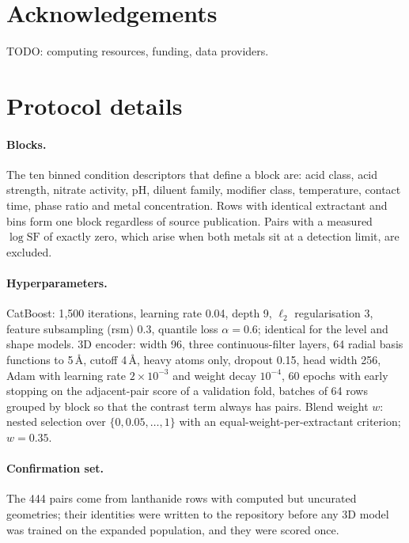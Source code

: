 \documentclass{article}
\begin{document}
\section*{Acknowledgements}
TODO: computing resources, funding, data providers.




\appendix

\section{Protocol details}
\label{app:protocol}

\paragraph{Blocks.}
The ten binned condition descriptors that define a block are: acid class, acid strength, nitrate activity, pH, diluent family, modifier class, temperature, contact time, phase ratio and metal concentration.
Rows with identical extractant and bins form one block regardless of source publication.
Pairs with a measured $\log \mathrm{SF}$ of exactly zero, which arise when both metals sit at a detection limit, are excluded.

\paragraph{Hyperparameters.}
CatBoost: 1{,}500 iterations, learning rate 0.04, depth 9, $\ell_2$ regularisation 3, feature subsampling (rsm) 0.3, quantile loss $\alpha = 0.6$; identical for the level and shape models.
3D encoder: width 96, three continuous-filter layers, 64 radial basis functions to 5\,\AA{}, cutoff 4\,\AA{}, heavy atoms only, dropout 0.15, head width 256, Adam with learning rate $2\times10^{-3}$ and weight decay $10^{-4}$, 60 epochs with early stopping on the adjacent-pair score of a validation fold, batches of 64 rows grouped by block so that the contrast term always has pairs.
Blend weight $w$: nested selection over $\{0, 0.05, \dots, 1\}$ with an equal-weight-per-extractant criterion; $w = 0.35$.

\paragraph{Confirmation set.}
The 444 pairs come from lanthanide rows with computed but uncurated geometries; their identities were written to the repository before any 3D model was trained on the expanded population, and they were scored once.
\end{document}

